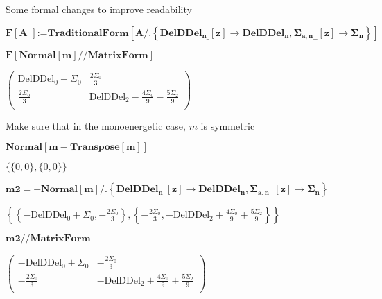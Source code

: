\documentclass{article}
\begin{document}
Some formal changes to improve readability

\begin{doublespace}
\noindent\(\pmb{F[\text{A$\_$}]\text{:=}\text{TraditionalForm}\left[A\text{/.}\left\{\text{DelDDel}_{\text{n$\_$}}[z]\to \text{DelDDel}_n,\Sigma
_{a,\text{n$\_\_$}}[z]\to \Sigma _n\right\}\right]}\)
\end{doublespace}

\begin{doublespace}
\noindent\(\pmb{F[\text{Normal}[m]\text{//}\text{MatrixForm}]}\)
\end{doublespace}

\begin{doublespace}
\noindent\(\left(
\begin{array}{cc}
 \text{DelDDel}_0-\Sigma _0 & \frac{2 \Sigma _0}{3} \\
 \frac{2 \Sigma _0}{3} & \text{DelDDel}_2-\frac{4 \Sigma _0}{9}-\frac{5 \Sigma _2}{9} \\
\end{array}
\right)\)
\end{doublespace}

Make sure that in the monoenergetic case, \(m\) is symmetric

\begin{doublespace}
\noindent\(\pmb{\text{Normal}[m-\text{Transpose}[m]]}\)
\end{doublespace}

\begin{doublespace}
\noindent\(\{\{0,0\},\{0,0\}\}\)
\end{doublespace}

\begin{doublespace}
\noindent\(\pmb{\text{m2}=-\text{Normal}[m]\text{/.}\left\{\text{DelDDel}_{\text{n$\_$}}[z]\to \text{DelDDel}_n,\Sigma _{a,\text{n$\_\_$}}[z]\to
\Sigma _n\right\}}\)
\end{doublespace}

\begin{doublespace}
\noindent\(\left\{\left\{-\text{DelDDel}_0+\Sigma _0,-\frac{2 \Sigma _0}{3}\right\},\left\{-\frac{2 \Sigma _0}{3},-\text{DelDDel}_2+\frac{4 \Sigma
_0}{9}+\frac{5 \Sigma _2}{9}\right\}\right\}\)
\end{doublespace}

\begin{doublespace}
\noindent\(\pmb{\text{m2}\text{//}\text{MatrixForm}}\)
\end{doublespace}

\begin{doublespace}
\noindent\(\left(
\begin{array}{cc}
 -\text{DelDDel}_0+\Sigma _0 & -\frac{2 \Sigma _0}{3} \\
 -\frac{2 \Sigma _0}{3} & -\text{DelDDel}_2+\frac{4 \Sigma _0}{9}+\frac{5 \Sigma _2}{9} \\
\end{array}
\right)\)
\end{doublespace}
\end{document}
